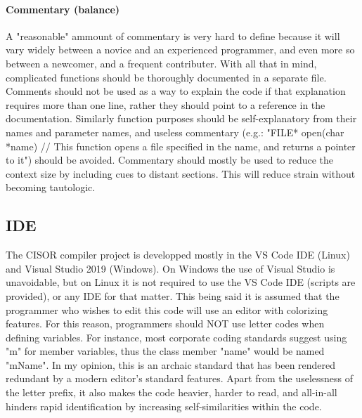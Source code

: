 \documentclass{article}
\begin{document}
\paragraph{Commentary (balance)} A "reasonable" ammount of commentary is very hard to define because it will vary widely between a novice and an experienced programmer, and even more so between a newcomer, and a frequent contributer. With all that in mind, complicated functions should be thoroughly documented in a separate file. Comments should not be used as a way to explain the code if that explanation requires more than one line, rather they should point to a reference in the documentation. Similarly function purposes should be self-explanatory from their names and parameter names, and useless commentary (e.g.: "FILE* open(char *name) // This function opens a file specified in the name, and returns a pointer to it") should be avoided. Commentary should mostly be used to reduce the context size by including cues to distant sections. This will reduce strain without becoming tautologic.

\subsection{IDE}
The CISOR compiler project is developped mostly in the VS Code IDE (Linux) and Visual Studio 2019 (Windows). On Windows the use of Visual Studio is unavoidable, but on Linux it is not required to use the VS Code IDE (scripts are provided), or any IDE for that matter. This being said it is assumed that the programmer who wishes to edit this code will use an editor with colorizing features. For this reason, programmers should NOT use letter codes when defining variables. For instance, most corporate coding standards suggest using "m" for member variables, thus the class member "name" would be named "mName". In my opinion, this is an archaic standard that has been rendered redundant by a modern editor's standard features. Apart from the uselessness of the letter prefix, it also makes the code heavier, harder to read, and all-in-all hinders rapid identification by increasing self-similarities within the code.
\end{document}
